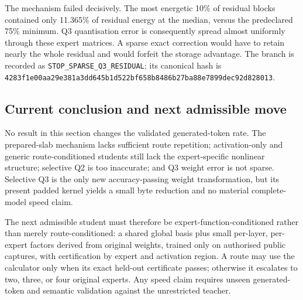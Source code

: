 The mechanism failed decisively.  The most energetic 10\% of residual blocks
contained only 11.365\% of residual energy at the median, versus the
predeclared 75\% minimum.  Q3 quantisation error is consequently spread almost
uniformly through these expert matrices.  A sparse exact correction would have
to retain nearly the whole residual and would forfeit the storage advantage.
The branch is recorded as \texttt{STOP\_SPARSE\_Q3\_RESIDUAL}; its canonical
hash is
\texttt{4283f1e00aa29e381a3dd645b1d522bf}\allowbreak\texttt{658b8486b27ba88e7899dec92d828013}.

\subsection{Current conclusion and next admissible move}

No result in this section changes the validated generated-token rate.  The
prepared-slab mechanism lacks sufficient route repetition; activation-only and
generic route-conditioned students still lack the expert-specific nonlinear
structure; selective Q2 is too inaccurate; and Q3 weight error is not sparse.
Selective Q3 is the only new
accuracy-passing weight transformation, but its present padded kernel yields a
small byte reduction and no material complete-model speed claim.

The next admissible student must therefore be expert-function-conditioned rather
than merely route-conditioned: a shared global basis plus small per-layer,
per-expert factors derived from original weights, trained only on authorised
public captures, with certification by expert and activation region.  A route
may use the calculator only when its exact held-out certificate passes; otherwise
it escalates to two, three, or four original experts.  Any speed claim requires
unseen generated-token and semantic validation against the unrestricted teacher.
\endgroup

